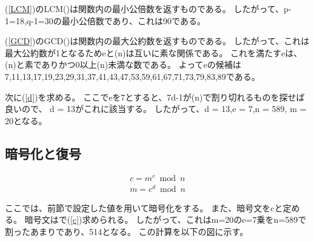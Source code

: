\documentclass[a4j]{jsarticle}
\begin{document}
(\ref{LCM})のLCM()は関数内の最小公倍数を返すものである。
したがって、p-1=18,q-1=30の最小公倍数であり、これは90である。

(\ref{GCD})のGCD()は関数内の最大公約数を返すものである。
したがって、これは最大公約数が1となるためeと\lambda(n)は互いに素な関係である。
これを満たすeは、\lambda(n)と素でありかつ0以上\lambda(n)未満な数である。
よってeの候補は{7,11,13,17,19,23,29,31,37,41,43,47,53,59,61,67,71,73,79,83,89}である。

次に(\ref{d})を求める。
ここでeを7とすると、7d-1が\lambda(n)で割り切れるものを探せば良いので、
d = 13がこれに該当する。
したがって、d = 13,e = 7,n = 589, m = 20となる。

\subsection{暗号化と復号}
\begin{eqnarray}
 \label{c}
 c = m^e \bmod n\\
 \label{rm}
 m = c^d \bmod n 
\end{eqnarray}

ここでは、前節で設定した値を用いて暗号化をする。
また、暗号文をcと定める。
暗号文はで(\ref{c})求められる。
したがって、これはm=20のe=7乗をn=589で割ったあまりであり、514となる。
この計算を以下の図に示す。
\end{document}
